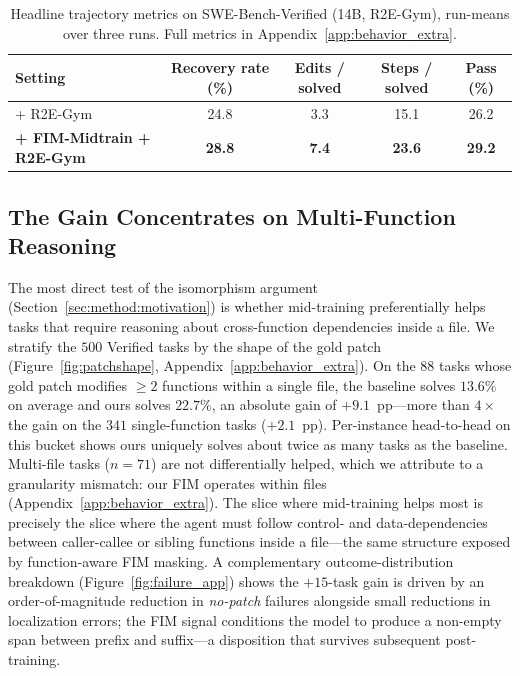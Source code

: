 \begin{table}[h]
\centering
\caption{Headline trajectory metrics on SWE-Bench-Verified (14B, R2E-Gym),
run-means over three runs. Full metrics in Appendix~\ref{app:behavior_extra}.}
\label{tab:behavior_main}
\small
\setlength{\tabcolsep}{8pt}
\vspace{-0.5ex}
\begin{tabular}{lcccc}
\toprule
Setting & Recovery rate (\%) & Edits / solved & Steps / solved & Pass (\%) \\
\midrule
+ R2E-Gym                          & 24.8           & 3.3           & 15.1           & 26.2 \\
\textbf{+ FIM-Midtrain + R2E-Gym}  & \textbf{28.8}  & \textbf{7.4}  & \textbf{23.6}  & \textbf{29.2} \\
\bottomrule
\end{tabular}
\vspace{-1ex}
\end{table}

\vspace{-0.5ex}
\subsection{The Gain Concentrates on Multi-Function Reasoning}
\label{sec:analysis:multifn}

The most direct test of the isomorphism argument
(Section~\ref{sec:method:motivation}) is whether mid-training
preferentially helps tasks that require reasoning about cross-function
dependencies inside a file. We stratify the $500$ Verified tasks by the
shape of the gold patch (Figure~\ref{fig:patchshape},
Appendix~\ref{app:behavior_extra}). On the $88$ tasks whose gold patch
modifies $\geq 2$ functions within a single file, the baseline solves
$13.6\%$ on average and ours solves $22.7\%$, an absolute gain of
$+9.1$~pp---more than $4{\times}$ the gain on the $341$ single-function
tasks ($+2.1$~pp). Per-instance head-to-head on this bucket shows ours
uniquely solves about twice as many tasks as the baseline. Multi-file
tasks ($n{=}71$) are not differentially helped, which we attribute to a
granularity mismatch: our FIM operates within files
(Appendix~\ref{app:behavior_extra}). The slice where mid-training helps
most is precisely the slice where the agent must follow control- and
data-dependencies between caller-callee or sibling functions inside a
file---the same structure exposed by function-aware FIM masking. A
complementary outcome-distribution breakdown
(Figure~\ref{fig:failure_app}) shows the $+15$-task gain is driven by an
order-of-magnitude reduction in \emph{no-patch} failures alongside small
reductions in localization errors; the FIM signal conditions the model
to produce a non-empty span between prefix and suffix---a disposition
that survives subsequent post-training.

